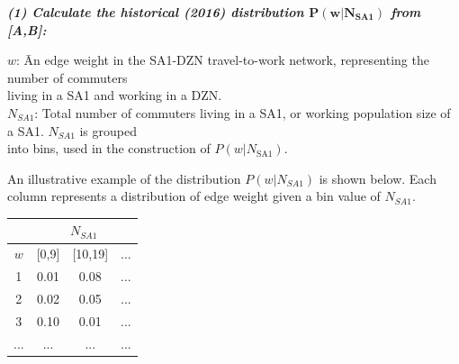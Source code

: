 \documentclass{article}
\begin{document}
\begin{appendices}
\begin{algorithm}[ht]
\begin{algorithmic}
\hspace*{-0.8cm} \textit{\textbf{(1) Calculate the historical (2016) distribution $\boldsymbol{P(w|N_{\text{SA1}})}$ from {[A,B]}:}}\\
\begin{tabbing}
    \hspace{1cm} $w$: \quad \quad \= An edge weight in the SA1-DZN travel-to-work network, representing the number of commuters\\ \> \quad \quad living in a SA1 and working in a DZN.\\
    \hspace{1cm} $N_{SA1}$: \> Total number of commuters living in a SA1, or working population size of a SA1. $N_{SA1}$ is grouped \\
    \> \quad \quad into bins, used in the construction of $P(w|N_\text{SA1})$.
\end{tabbing}
An illustrative example of the distribution $P(w|N_{SA1})$ is shown below. Each column represents a distribution of edge weight given a bin value of $N_{SA1}$.

\renewcommand{\arraystretch}{1.025}
\vspace*{0.25cm}\hspace*{4.8cm}\begin{tabular}{ |c|c|c|c|  }
 \hline
 & \multicolumn{3}{|c|}{$N_{SA1}$} \\
 \hline
 $w$        & [0,9]     & [10,19]   & ...\\
 \hline
 1          & 0.01      & 0.08      & ...\\
 2          & 0.02      & 0.05      & ...\\
 3          & 0.10      & 0.01      & ...\\
 ...        & ...       & ...       & ...\\
 \hline
\end{tabular}


\end{algorithmic}
\end{algorithm}
\end{appendices}
\end{document}
